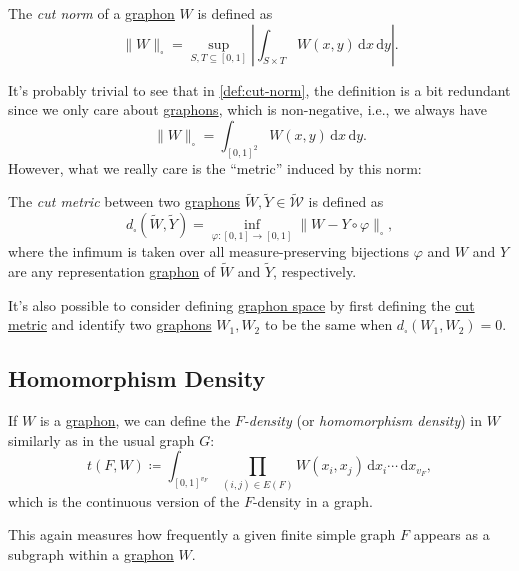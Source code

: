 \begin{definition}\label{def:cut-norm}
	The \emph{cut norm} of a \hyperref[def:graphon]{graphon} \(W\) is defined as
	\[
		\lVert W \rVert _{\square }
		= \sup _{S, T \subseteq [0, 1]} \left\lvert \int _{S \times T} W(x, y) \,\mathrm{d} x \,\mathrm{d} y \right\rvert .
	\]
\end{definition}

It's probably trivial to see that in \autoref{def:cut-norm}, the definition is a bit redundant since we only care about \hyperref[def:graphon]{graphons}, which is non-negative, i.e., we always have
\[
	\lVert W \rVert _{\square }
	= \int_{[0, 1]^2} W(x, y) \,\mathrm{d}x \,\mathrm{d} y.
\]
However, what we really care is the ``metric'' induced by this norm:

\begin{definition}\label{def:cut-metric}
	The \emph{cut metric} between two \hyperref[def:graphon]{graphons} \(\widetilde{W} , \widetilde{Y} \in \widetilde{\mathcal{W} } \) is defined as
	\[
		d_{\square}(\widetilde{W} , \widetilde{Y} ) = \inf _{\varphi \colon [0, 1] \to [0, 1]} \lVert W - Y \circ \varphi \rVert _{\square},
	\]
	where the infimum is taken over all measure-preserving bijections \(\varphi \) and \(W\) and \(Y\) are any representation \hyperref[def:graphon]{graphon} of \(\widetilde{W} \) and \(\widetilde{Y} \), respectively.
\end{definition}

\begin{remark}
	It's also possible to consider defining \hyperref[def:graphon-space]{graphon space} by first defining the \hyperref[def:cut-metric]{cut metric} and identify two \hyperref[def:graphon]{graphons} \(W_1, W_2\) to be the same when \(d_{\square }(W_1 , W_2) = 0\).
\end{remark}

\subsection{Homomorphism Density}
If \(W\) is a \hyperref[def:graphon]{graphon}, we can define the \emph{\(F\)-density} (or \emph{homomorphism density}) in \(W\) similarly as in the usual graph \(G\):
\[
	t(F, W)
	\coloneqq \int_{[0, 1]^{v_F}} \prod_{(i, j) \in E(F)} W(x_i, x_j) \,\mathrm{d} x_i \cdots \,\mathrm{d} x_{v_F},
\]
which is the continuous version of the \(F\)-density in a graph.

\begin{intuition}
	This again measures how frequently a given finite simple graph \(F\) appears as a subgraph within a \hyperref[def:graphon]{graphon} \(W\).
\end{intuition}


